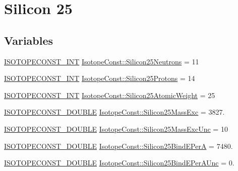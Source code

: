 \hypertarget{group___isotope_const-_silicon-_si25}{}\section{Silicon 25}
\label{group___isotope_const-_silicon-_si25}
\subsection*{Variables}
\begin{DoxyCompactItemize}
\item 
\mbox{\hyperlink{group___isotope_const-_macros_ga5f18360b3e99483a35c32d789e62621c}{I\+S\+O\+T\+O\+P\+E\+C\+O\+N\+S\+T\+\_\+\+I\+NT}} \mbox{\hyperlink{group___isotope_const-_silicon-_si25_ga11c689aa15a27d1e19a4934526fa2df9}{Isotope\+Const\+::\+Silicon25\+Neutrons}} = 11
\item 
\mbox{\hyperlink{group___isotope_const-_macros_ga5f18360b3e99483a35c32d789e62621c}{I\+S\+O\+T\+O\+P\+E\+C\+O\+N\+S\+T\+\_\+\+I\+NT}} \mbox{\hyperlink{group___isotope_const-_silicon-_si25_gab0978e1f3199464c1131747fdfab4454}{Isotope\+Const\+::\+Silicon25\+Protons}} = 14
\item 
\mbox{\hyperlink{group___isotope_const-_macros_ga5f18360b3e99483a35c32d789e62621c}{I\+S\+O\+T\+O\+P\+E\+C\+O\+N\+S\+T\+\_\+\+I\+NT}} \mbox{\hyperlink{group___isotope_const-_silicon-_si25_gae147fd03fc867b11c74f2577dd385294}{Isotope\+Const\+::\+Silicon25\+Atomic\+Weight}} = 25
\item 
\mbox{\hyperlink{group___isotope_const-_macros_ga8f45a7272ce02c0b4c65c44636ed719a}{I\+S\+O\+T\+O\+P\+E\+C\+O\+N\+S\+T\+\_\+\+D\+O\+U\+B\+LE}} \mbox{\hyperlink{group___isotope_const-_silicon-_si25_gac37b0479742a8fa7b54ec13949ca0ddc}{Isotope\+Const\+::\+Silicon25\+Mass\+Exc}} = 3827.
\item 
\mbox{\hyperlink{group___isotope_const-_macros_ga8f45a7272ce02c0b4c65c44636ed719a}{I\+S\+O\+T\+O\+P\+E\+C\+O\+N\+S\+T\+\_\+\+D\+O\+U\+B\+LE}} \mbox{\hyperlink{group___isotope_const-_silicon-_si25_gaa70b3a476b6fbc0aa38d55d732a3bff0}{Isotope\+Const\+::\+Silicon25\+Mass\+Exc\+Unc}} = 10
\item 
\mbox{\hyperlink{group___isotope_const-_macros_ga8f45a7272ce02c0b4c65c44636ed719a}{I\+S\+O\+T\+O\+P\+E\+C\+O\+N\+S\+T\+\_\+\+D\+O\+U\+B\+LE}} \mbox{\hyperlink{group___isotope_const-_silicon-_si25_ga49c7abccbf3d6708670c7201ecedfaae}{Isotope\+Const\+::\+Silicon25\+Bind\+E\+PerA}} = 7480.
\item 
\mbox{\hyperlink{group___isotope_const-_macros_ga8f45a7272ce02c0b4c65c44636ed719a}{I\+S\+O\+T\+O\+P\+E\+C\+O\+N\+S\+T\+\_\+\+D\+O\+U\+B\+LE}} \mbox{\hyperlink{group___isotope_const-_silicon-_si25_ga9884e0690fcdbba745aae21e552a7054}{Isotope\+Const\+::\+Silicon25\+Bind\+E\+Per\+A\+Unc}} = 0.

\end{DoxyCompactItemize}
